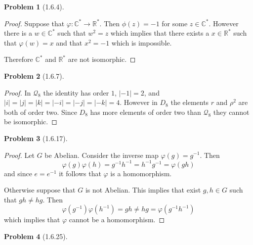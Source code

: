 \documentclass[10pt]{article}
\newcommand{\sk}{\vskip 10mm}
\newcommand{\bb}[1]{\mathbb{#1}}
\theoremstyle{plain}
\newtheorem{problem}{Problem}
\theoremstyle{remark}
\begin{document}
\sk

\begin{problem}[1.6.4]
  
\end{problem}

\begin{proof}
  Suppose that $\varphi:\bb{C}^*\rightarrow\bb{R}^*$. Then $\phi(z)=-1$ for some
  $z\in\bb{C}^*$. However there is a $w\in \bb{C}^*$ such that $w^2=z$
  which implies that there exists a $x\in\bb{R}^*$ such that
  $\varphi(w)=x$ and that $x^2=-1$ which is impossible.

  Therefore $\bb{C}^*$ and $\bb{R}^*$ are not isomorphic.
\end{proof}

\sk

\begin{problem}[1.6.7]
  
\end{problem}

\begin{proof}
  In $\mathcal{Q}_8$ the identity has order $1$, $|-1|=2$, and
  $|i|=|j|=|k|=|-i|=|-j|=|-k|=4$. However in $D_8$ the elements
  $r$ and $\rho^2$ are both of order two. Since $D_8$ has more
  elements of order two than $\mathcal{Q}_8$ they cannot be
  isomorphic.
\end{proof}

\sk

\begin{problem}[1.6.17]
  
\end{problem}

\begin{proof}
  Let $G$ be Abelian. Consider the inverse map $\varphi(g)=g^{-1}$.
  Then
  \[ \varphi(g)\varphi(h)=g^{-1}h^{-1}=h^{-1}g^{-1}=\varphi(gh)\]
  and since $e=e^{-1}$ it follows that $\varphi$ is a homomorphism.

  Otherwise suppose that $G$ is not Abelian. This implies that
  exist $g,h\in G$ such that $gh\neq hg$. Then
  \[ \varphi(g^{-1})\varphi(h^{-1})=gh\neq hg = \varphi(g^{-1}h^{-1})\]
  which implies that $\varphi$ cannot be a homomorphism.
\end{proof}

\sk

\begin{problem}[1.6.25]
  
\end{problem}
\end{document}
